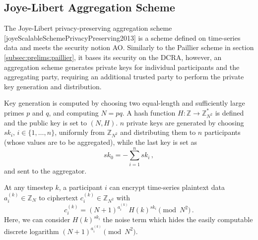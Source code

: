 % 
% 

\subsection{Joye-Libert Aggregation Scheme}\label{subsec:prelims:joye_libert_agg}
The Joye-Libert privacy-preserving aggregation scheme [joyeScalableSchemePrivacyPreserving2013] is a scheme defined on time-series data and meets the security notion AO. Similarly to the Paillier scheme in section \ref{subsec:prelims:paillier}, it bases its security on the DCRA, however, an aggregation scheme generates private keys for individual participants and the aggregating party, requiring an additional trusted party to perform the private key generation and distribution.

Key generation is computed by choosing two equal-length and sufficiently large primes $p$ and $q$, and computing $N=pq$. A hash function $H:\mathbb{Z} \rightarrow \mathbb{Z}_{N^2}^*$ is defined and the public key is set to $(N, H)$. $n$ private keys are generated by choosing $sk_i,\,i\in\{1,\dots,n\}$, uniformly from $\mathbb{Z}_{N^2}$ and distributing them to $n$ participants (whose values are to be aggregated), while the last key is set as
\begin{equation}
    sk_0 = -\sum^{n}_{i=1}sk_i\,,
\end{equation}
and sent to the aggregator.

At any timestep $k$, a participant $i$ can encrypt time-series plaintext data $a^{(k)}_{i} \in \mathbb{Z}_N$ to ciphertext $c^{(k)}_{i} \in \mathbb{Z}_{N^2}$ with
\begin{equation}
    c^{(k)}_{i} = (N+1)^{a^{(k)}_{i}} H(k)^{sk_i} \pmod{N^2}\,.
\end{equation}
Here, we can consider $H(k)^{sk_i}$ the noise term which hides the easily computable discrete logarithm $(N+1)^{a^{(k)}_{i}} \pmod{N^2}$.

